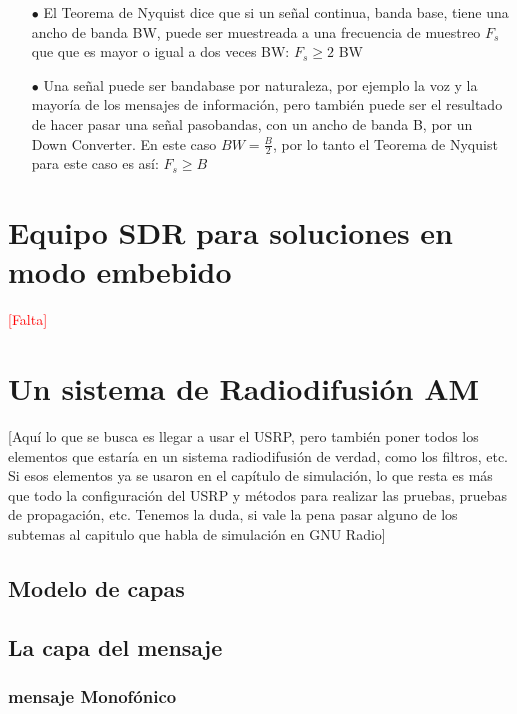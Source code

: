 \begin{itemize}
	
	\item [$\bullet$] 	El Teorema de Nyquist dice que si un señal continua, banda base, tiene una ancho de banda BW, puede ser muestreada a una frecuencia de muestreo $F_{s}$ que que es mayor o igual a dos veces BW: $F_{s} \geq 2$ BW
	\item [$\bullet$] Una señal puede ser bandabase por naturaleza, por ejemplo la voz y la mayoría de los mensajes de información, pero también puede ser el resultado de hacer pasar una señal pasobandas, con un ancho de banda B, por un Down Converter. En este caso $BW = \frac{B}{2}$, por lo tanto el Teorema de Nyquist para este caso es así: $F_{s} \geq B	$
\end{itemize}



\section{Equipo SDR para soluciones en modo embebido}
\textcolor{red}{[Falta]}


\section{Un sistema de Radiodifusión AM}
[Aquí lo que se busca es llegar a usar el USRP, pero también poner todos los elementos que estaría en un sistema radiodifusión de verdad, como los filtros, etc. Si esos elementos ya se usaron en el capítulo de simulación, lo que resta es más que todo la configuración del USRP y métodos para realizar las pruebas, pruebas de propagación, etc. Tenemos la duda, si vale la pena pasar alguno de los subtemas al capitulo que habla de simulación en GNU Radio]

\subsection{Modelo de capas}
\subsection{La capa del mensaje}
\subsubsection{mensaje Monofónico}
